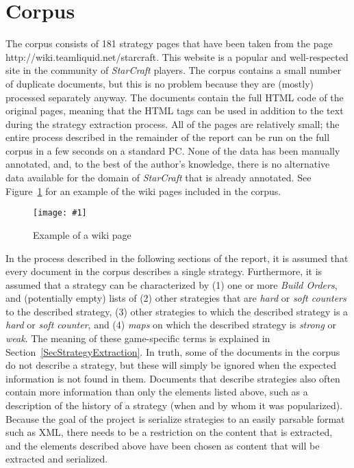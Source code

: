 \documentclass[]{article}
\newcommand{\insertfigure}[3]{ 
	\begin{figure}[#3]
	\begin{center}
	\texttt{[image: \#1]}
	\caption{#2}
	\label{#1}
	\end{center}
	\end{figure}
}
\newcommand{\reffigure}[1]{Figure~\ref{#1}}
\newcommand{\refsection}[1]{Section~\ref{#1}}
\begin{document}
\section{Corpus} \label{SecCorpus}
The corpus consists of 181 strategy pages that have been taken from the page http://wiki.teamliquid.net/starcraft. This website is a popular and well-respected site in the community of \emph{StarCraft} players. The corpus contains a small number of duplicate documents, but this is no problem because they are (mostly) processed separately anyway. The documents contain the full HTML code of the original pages, meaning that the HTML tags can be used in addition to the text during the strategy extraction process. All of the pages are relatively small; the entire process described in the remainder of the report can be run on the full corpus in a few seconds on a standard PC. None of the data has been manually annotated, and, to the best of the author's knowledge, there is no alternative data available for the domain of \emph{StarCraft} that is already annotated. See \reffigure{ExampleWikiPage} for an example of the wiki pages included in the corpus.

\insertfigure{ExampleWikiPage}{Example of a wiki page}{h}

In the process described in the following sections of the report, it is assumed that every document in the corpus describes a single strategy. Furthermore, it is assumed that a strategy can be characterized by (1) one or more \emph{Build Orders}, and (potentially empty) lists of (2) other strategies that are \emph{hard} or \emph{soft counters} to the described strategy, (3) other strategies to which the described strategy is a \emph{hard} or \emph{soft counter}, and (4) \emph{maps} on which the described strategy is \emph{strong} or \emph{weak}. The meaning of these game-specific terms is explained in \refsection{SecStrategyExtraction}. In truth, some of the documents in the corpus do not describe a strategy, but these will simply be ignored when the expected information is not found in them. Documents that describe strategies also often contain more information than only the elements listed above, such as a description of the history of a strategy (when and by whom it was popularized). Because the goal of the project is serialize strategies to an easily parsable format such as XML, there needs to be a restriction on the content that is extracted, and the elements described above have been chosen as content that will be extracted and serialized.
\end{document}
